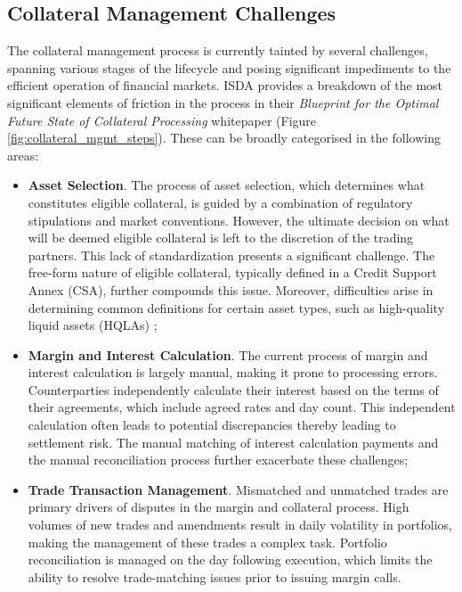 \subsection{Collateral Management Challenges}
\label{subsec:collateral_mgmt}
The collateral management process is currently tainted by several challenges, spanning various stages of the lifecycle and posing significant impediments to the efficient operation of financial markets. ISDA provides a breakdown of the most significant elements of friction in the process in their \textit{Blueprint for the Optimal Future State of Collateral Processing} \cite{isda_blueprint_collateral_processing} whitepaper (Figure \ref{fig:collateral_mgmt_steps}). These can be broadly categorised in the following areas:

\begin{itemize}
    \item \textbf{Asset Selection}. The process of asset selection, which determines what constitutes eligible collateral, is guided by a combination of regulatory stipulations and market conventions. However, the ultimate decision on what will be deemed eligible collateral is left to the discretion of the trading partners. This lack of standardization presents a significant challenge. The free-form nature of eligible collateral, typically defined in a Credit Support Annex (CSA), further compounds this issue. Moreover, difficulties arise in determining common definitions for certain asset types, such as high-quality liquid assets (HQLAs) \citep{HQLAs};

    \item \textbf{Margin and Interest Calculation}. The current process of margin and interest calculation is largely manual, making it prone to processing errors. Counterparties independently calculate their interest based on the terms of their agreements, which include agreed rates and day count. This independent calculation often leads to potential discrepancies thereby leading to settlement risk. The manual matching of interest calculation payments and the manual reconciliation process further exacerbate these challenges;

    \item \textbf{Trade Transaction Management}. Mismatched and unmatched trades are primary drivers of disputes in the margin and collateral process. High volumes of new trades and amendments result in daily volatility in portfolios, making the management of these trades a complex task. Portfolio reconciliation is managed on the day following execution, which limits the ability to resolve trade-matching issues prior to issuing margin calls.


\end{itemize}
